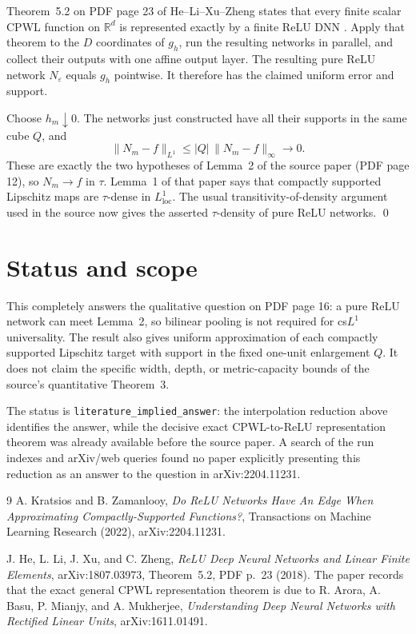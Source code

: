 \documentclass[11pt]{article}
\newcommand{\R}{\mathbb{R}}
\begin{document}
Theorem~5.2 on PDF page 23 of He--Li--Xu--Zheng states that every finite
scalar CPWL function on \(\R^d\) is represented exactly by a finite ReLU
DNN \cite{HLXZ2018}.  Apply that theorem to the \(D\) coordinates of
\(g_h\), run the resulting networks in parallel, and collect their outputs
with one affine output layer.  The resulting pure ReLU network
\(N_\varepsilon\) equals \(g_h\) pointwise.  It therefore has the claimed
uniform error and support.

Choose \(h_m\downarrow0\).  The networks just constructed have all their
supports in the same cube \(Q\), and
\[
 \lVert N_m-f\rVert_{L^1}
 \leq |Q|\,\lVert N_m-f\rVert_\infty\longrightarrow0.
\]
These are exactly the two hypotheses of Lemma~2 of the source paper (PDF
page 12), so \(N_m\to f\) in \(\tau\).  Lemma~1 of that paper says that
compactly supported Lipschitz maps are \(\tau\)-dense in
\(L^1_{\mathrm{loc}}\).  The usual transitivity-of-density argument used in
the source now gives the asserted \(\tau\)-density of pure ReLU networks.
\qed

\section*{Status and scope}

This completely answers the qualitative question on PDF page 16: a pure ReLU
network can meet Lemma~2, so bilinear pooling is not required for cs\(L^1\)
universality.  The result also gives uniform approximation of each compactly
supported Lipschitz target with support in the fixed one-unit enlargement
\(Q\).  It does not claim the specific width, depth, or metric-capacity bounds
of the source's quantitative Theorem~3.

The status is \texttt{literature\_implied\_answer}: the interpolation
reduction above identifies the answer, while the decisive exact CPWL-to-ReLU
representation theorem was already available before the source paper.  A
search of the run indexes and arXiv/web queries found no paper explicitly
presenting this reduction as an answer to the question in arXiv:2204.11231.

\begin{thebibliography}{9}
A. Kratsios and B. Zamanlooy,
\emph{Do ReLU Networks Have An Edge When Approximating Compactly-Supported
Functions?}, Transactions on Machine Learning Research (2022),
arXiv:2204.11231.

J. He, L. Li, J. Xu, and C. Zheng,
\emph{ReLU Deep Neural Networks and Linear Finite Elements},
arXiv:1807.03973, Theorem~5.2, PDF p.~23 (2018).
The paper records that the exact general CPWL representation theorem is due
to R. Arora, A. Basu, P. Mianjy, and A. Mukherjee,
\emph{Understanding Deep Neural Networks with Rectified Linear Units},
arXiv:1611.01491.
\end{thebibliography}
\end{document}
